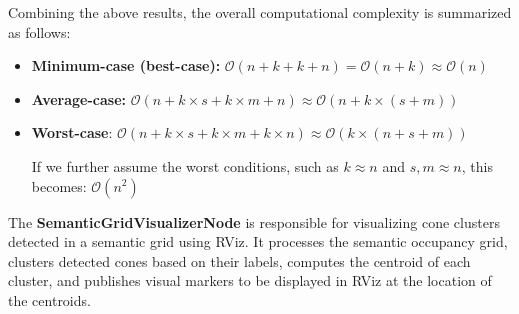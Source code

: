 \begin{itemize}
\end{itemize}

Combining the above results, the overall computational complexity is summarized as follows:

\begin{itemize}
    \item \textbf{Minimum-case (best-case):} $\mathcal{O}(n + k + k + n) = \mathcal{O}(n + k)\approx \mathcal{O}(n)$

    \item \textbf{Average-case:} $\mathcal{O}(n + k \times s + k \times m + n) \approx \mathcal{O}(n + k \times (s + m))$

    \item \textbf{Worst-case}: $\mathcal{O}(n + k \times s + k \times m + k \times n) \approx \mathcal{O}(k \times (n + s + m))$
    
    If we further assume the worst conditions, such as $k \approx n$ and $s, m \approx n$, this becomes:
    $\mathcal{O}(n^2)$
\end{itemize}

The \textbf{SemanticGridVisualizerNode} is responsible for visualizing cone clusters detected in a semantic grid using RViz. It processes the semantic occupancy grid, clusters detected cones based on their labels, computes the centroid of each cluster, and publishes visual markers to be displayed in RViz at the location of the centroids.\\

